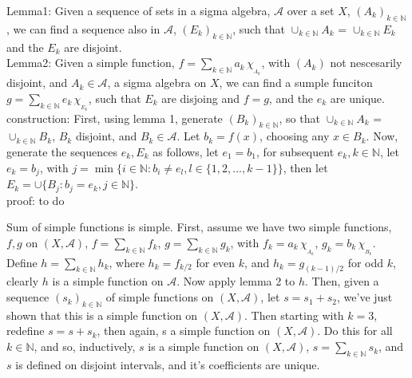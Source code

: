 \documentclass[12pt]{article}
\newcommand{\nats}[0] { \mathbb{N}}
\begin{document}
\begin{flushleft}
Lemma1: Given a sequence of sets in a sigma algebra, $\mathcal{A}$ over a set $X$, $(A_k)_{k \in \nats}$, we can find a sequence also in $\mathcal{A}$, $(E_k)_{k \in \nats}$, such that $\cup_{k \in \nats} A_k$ = $\cup_{k \in \nats} E_k$ and the $E_k$ are disjoint. \\
Lemma2: Given a simple function, $f = \sum_{k \in \mathbb{N}} a_k \, \chi_{_{A_k}}$, with $(A_k)$ not nescesarily disjoint, and $A_k \in \mathcal{A}$, a sigma algebra on $X$, we can find a sumple funciton $g = \sum_{k \in \mathbb{N}} e_k \, \chi_{_{E_k}}$, such that $E_k$ are disjoing and $f=g$, and the $e_k$ are unique. \\
construction: First, using lemma 1, generate $(B_k)_{k \in \nats}$, so that $\cup_{k \in \nats} A_k$ = $\cup_{k \in \nats} B_k$, $B_k$ disjoint, and $B_k \in \mathcal{A}$. Let $b_k = f(x)$, choosing any $x \in B_k$.  Now, generate the sequences $e_k, E_k$ as follows, let $e_1 = b_1$, for subsequent $e_k, k \in \nats$, let $e_k = b_j$, with $j = \min \{  i \in \nats: b_i \not = e_l, l \in \{  1,2,...,k-1 \} \}$, then let $E_k = \cup \{ B_j: b_j = e_k, j \in \nats \}$.\\
proof: to do
\end{flushleft}
\begin{flushleft}
Sum of simple functions is simple. First, assume we have two simple functions, $f,g$ on $(X,\mathcal{A})$, $f = \sum_{k \in \mathbb{N}} f_k $, $g = \sum_{k \in \mathbb{N}} g_k $, with $f_k = a_k \, \chi_{_{A_k}}$, $g_k = b_k \, \chi_{_{B_k}}$. Define $h = \sum_{k \in \mathbb{N}} h_k $, where $h_k = f_{k/2}$ for even $k$, and $h_k = g_{(k-1)/2}$ for odd $k$, clearly $h$ is a simple function on $\mathcal{A}$. Now apply lemma 2 to $h$. Then, given a sequence $(s_k)_{k \in \nats}$ of simple functions on $(X,\mathcal{A})$, let $s = s_1 + s_2$, we've just shown that this is a simple function on $(X,\mathcal{A})$. Then starting with $k=3$, redefine $s = s+s_k$, then again, s a simple function on $(X,\mathcal{A})$. Do this for all $k \in \nats$, and so, inductively, $s$ is a simple function on $(X,\mathcal{A})$, $s = \sum_{k \in \nats} s_k$, and $s$ is defined on disjoint intervals, and it's coefficients are unique.
\end{flushleft}
\end{document}
